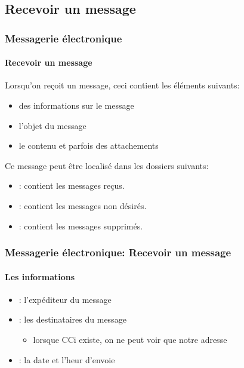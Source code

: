 \documentclass[xcolor=table]{beamer}
\begin{document}
%
%


\subsection{Recevoir un message}

\begin{frame}
\frametitle{Messagerie électronique}
\framesubtitle{Recevoir un message}

Lorsqu'on reçoit un message, ceci contient les éléments suivants: 
\begin{itemize}
	\item des informations sur le message
	\item l'objet du message
	\item le contenu et parfois des attachements
\end{itemize}

Ce message peut être localisé dans les dossiers suivants:
\begin{itemize}
	\item {}: contient les messages reçus.
	\item {}: contient les messages non désirés.
	\item {}: contient les messages supprimés.
\end{itemize}

\end{frame}

\begin{frame}
\frametitle{Messagerie électronique: Recevoir un message}
\framesubtitle{Les informations}

\begin{itemize}
	\item {}: l'expéditeur du message
	
	\item {}: les destinataires du message 
	\begin{itemize}
		\item lorsque CCi existe, on ne peut voir que notre adresse 
	\end{itemize}
	
	\item {}: la date et l'heur d'envoie  
	
\end{itemize}


\end{frame}
\end{document}
